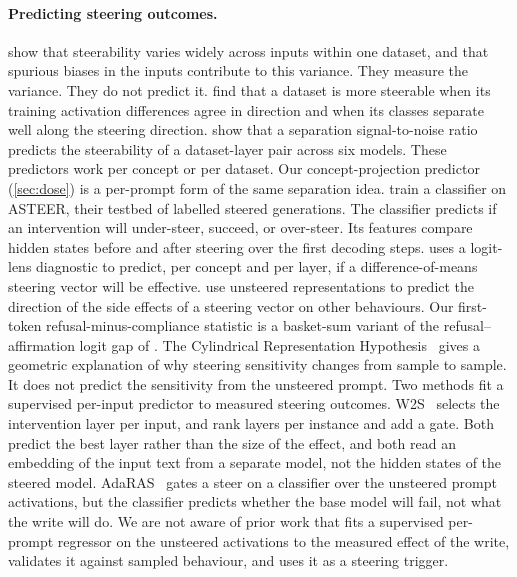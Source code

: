 \documentclass[11pt]{article}
\begin{document}
\paragraph{Predicting steering outcomes.}
\citet{tan2024reliability} show that steerability varies widely across inputs within one dataset, and that
spurious biases in the inputs contribute to this variance. They measure the variance. They do not predict
it. \citet{braun2025unreliability} find that a dataset is more steerable when its training activation
differences agree in direction and when its classes separate well along the steering direction.
\citet{bhattarai2026signatures} show that a separation signal-to-noise ratio predicts the steerability of
a dataset-layer pair across six models. These predictors work per concept or per dataset. Our
concept-projection predictor (\cref{sec:dose}) is a per-prompt form of the same separation idea.
\citet{fan2026asteer} train a classifier on ASTEER, their testbed of labelled steered generations. The
classifier predicts if an intervention will under-steer, succeed, or over-steer. Its features compare
hidden states before and after steering over the first decoding steps. \citet{billa2026where} uses a
logit-lens diagnostic to predict, per concept and per layer, if a difference-of-means steering vector will
be effective. \citet{ong2026sideeffects} use unsteered representations to predict the direction of the side effects of a steering vector on other behaviours. Our first-token refusal-minus-compliance statistic is a basket-sum
variant of the refusal--affirmation logit gap of \citet{li2025logitgap}. The Cylindrical Representation
Hypothesis~\citep{gao2026crh} gives a geometric explanation of why steering sensitivity changes from sample
to sample. It does not predict the sensitivity from the unsteered prompt. Two methods fit a supervised per-input predictor to measured steering outcomes. W2S~\citep{w2s2026layer} selects the intervention layer per input, and \citet{perinstance2026layers} rank layers per instance and add a gate. Both predict the best layer rather than the size of the effect, and both read an embedding of the input text from a separate model, not the hidden states of the steered model. AdaRAS~\citep{adaras2026neurons} gates a steer on a classifier over the unsteered prompt activations, but the classifier predicts whether the base model will fail, not what the write will do. We are not aware of prior work that fits a supervised per-prompt regressor on the unsteered activations to the measured effect of the write, validates it against sampled behaviour, and uses it as a steering trigger.
\end{document}
